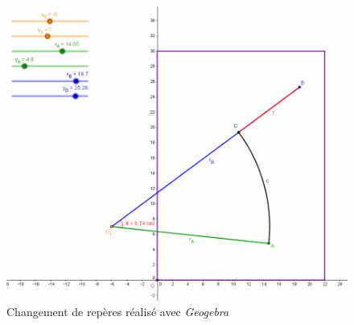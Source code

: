 \documentclass[12pt,a4paper]{report}
\begin{document}
\begin{figure}[!h]
 \center
 \includegraphics[scale=0.5]{../pictures/Changement_repere}
 \caption{Changement de repères réalisé avec \emph{Geogebra}}
 \label{polaire}
\end{figure}
\end{document}
